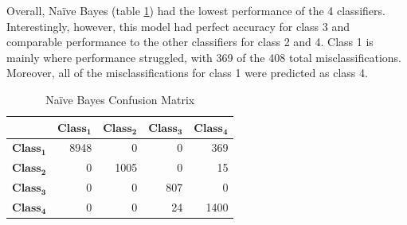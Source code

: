 \documentclass[letterpaper, 10 pt, conference]{ieeeconf}  %
\begin{document}
Overall, Na\"{i}ve Bayes (table \ref{tab:NB_CM}) had the lowest performance of the 4 classifiers. Interestingly, however, this model had perfect accuracy for class 3 and comparable performance to the other classifiers for class 2 and 4. Class 1 is mainly where performance struggled, with 369 of the 408 total misclassifications. Moreover, all of the misclassifications for class 1 were predicted as class 4.

\begin{table}[htb]
    \centering
    \begin{tabular}{|c|r|r|r|r|}
        \hline
        & \multicolumn{1}{c|}{$\boldsymbol{Class_1}$} & \multicolumn{1}{c|}{$\boldsymbol{Class_2}$} & \multicolumn{1}{c|}{$\boldsymbol{Class_3}$} & \multicolumn{1}{c|}{$\boldsymbol{Class_4}$} \\
        \hline
        $\boldsymbol{Class_1}$ & 8948 & 0 & 0 & 369 \\
        \hline
        $\boldsymbol{Class_2}$ & 0 & 1005 &  0 & 15 \\
        \hline
        $\boldsymbol{Class_3}$ & 0 & 0 & 807 & 0 \\
        \hline
        $\boldsymbol{Class_4}$ & 0 & 0 & 24 & 1400 \\
        \hline
 
    \end{tabular}
    \caption{Na\"{i}ve Bayes Confusion Matrix}
    \label{tab:NB_CM}
\end{table}




\clearpage
\end{document}
